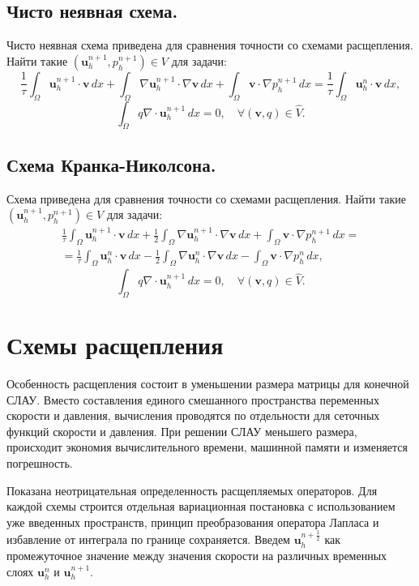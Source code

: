 \documentclass[12pt]{article}
\begin{document}
\subsection{Чисто неявная схема.} Чисто неявная схема приведена для сравнения точности со схемами расщепления. 
Найти такие $({\bm u}_h^{n+1}, p_h^{n+1}) \in V$ для задачи:
\begin{equation} \label{eq:scheme-impl-1}
\frac{1}{\tau} \int_\Omega {\bm u_h^{n+1}} \cdot {\bm v} \, dx + \int_\Omega \nabla {\bm u_h^{n+1}} \cdot \nabla {\bm v} \, dx + \int_\Omega {\bm v} \cdot \nabla p_h^{n+1} \, dx = \frac{1}{\tau} \int_\Omega {\bm u}_h^n \cdot {\bm v} \, dx, 
\end{equation}
$$
\int_\Omega q \nabla \cdot {\bm u_h^{n+1}} \, dx = 0, \quad \forall ({\bm v},q) \in \hat V.
$$

\subsection{Схема Кранка-Николсона.} Схема приведена для сравнения точности со схемами расщепления.
Найти такие $({\bm u}_h^{n+1}, p_h^{n+1}) \in V$ для задачи:
\begin{eqnarray*}
\frac{1}{\tau} \int_\Omega {\bm u_h^{n+1}} \cdot {\bm v} \, dx + \frac{1}{2} \int_\Omega \nabla {\bm u_h^{n+1}} \cdot \nabla {\bm v} \, dx + \int_\Omega {\bm v} \cdot \nabla p_h^{n+1} \, dx = \nonumber\\  = \frac{1}{\tau} \int_\Omega {\bm u}_h^n \cdot {\bm v} \, dx - \frac{1}{2} \int_\Omega \nabla {\bm u}_h^n \cdot \nabla {\bm v} \, dx - \int_\Omega {\bm v} \cdot \nabla p_h^{n} \, dx ,
\end{eqnarray*}
$$
\int_\Omega q \nabla \cdot {\bm u_h^{n+1}} \, dx = 0, \quad \forall ({\bm v},q) \in \hat V.
$$

\section{Схемы расщепления}
Особенность расщепления состоит в уменьшении размера матрицы для конечной СЛАУ. Вместо составления единого смешанного пространства переменных скорости и давления, вычисления проводятся по отдельности для сеточных функций скорости и давления. При решении СЛАУ меньшего размера, происходит экономия вычислительного времени, машинной памяти и изменяется погрешность.

Показана неотрицательная определенность расщепляемых операторов.
Для каждой схемы строится отдельная вариационная постановка с использованием уже введенных пространств, принцип преобразования оператора Лапласа и избавление от интеграла по границе сохраняется. Введем ${\bm u}_h^{n+\frac{1}{2}}$ как промежуточное значение между значения скорости на различных временных слоях ${\bm u}_h^n$ и ${\bm u}_h^{n+1}$.
\end{document}
